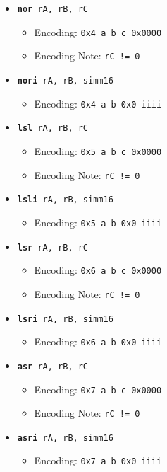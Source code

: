 \documentclass{article}
\begin{document}
\begin{itemize}
		\item \texttt{\textbf{nor} rA, rB, rC}
		\begin{itemize}
			\item Encoding:  \texttt{0x4 a b c  0x0000}
			\item Encoding Note:  \texttt{rC != 0}
		\end{itemize}
		\item \texttt{\textbf{nori} rA, rB, simm16}
		\begin{itemize}
			\item Encoding:  \texttt{0x4 a b 0x0  iiii}
		\end{itemize}


		\item \texttt{\textbf{lsl} rA, rB, rC}
		\begin{itemize}
			\item Encoding:  \texttt{0x5 a b c  0x0000}
			\item Encoding Note:  \texttt{rC != 0}
		\end{itemize}
		\item \texttt{\textbf{lsli} rA, rB, simm16}
		\begin{itemize}
			\item Encoding:  \texttt{0x5 a b 0x0  iiii}
		\end{itemize}


		\item \texttt{\textbf{lsr} rA, rB, rC}
		\begin{itemize}
			\item Encoding:  \texttt{0x6 a b c  0x0000}
			\item Encoding Note:  \texttt{rC != 0}
		\end{itemize}
		\item \texttt{\textbf{lsri} rA, rB, simm16}
		\begin{itemize}
			\item Encoding:  \texttt{0x6 a b 0x0  iiii}
		\end{itemize}


		\item \texttt{\textbf{asr} rA, rB, rC}
		\begin{itemize}
			\item Encoding:  \texttt{0x7 a b c  0x0000}
			\item Encoding Note:  \texttt{rC != 0}
		\end{itemize}
		\item \texttt{\textbf{asri} rA, rB, simm16}
		\begin{itemize}
			\item Encoding:  \texttt{0x7 a b 0x0  iiii}
		\end{itemize}



\end{itemize}
\end{document}
